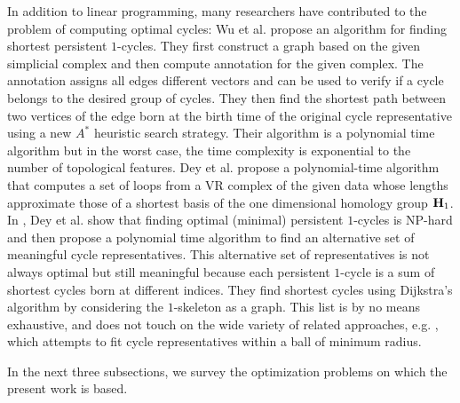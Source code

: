 In addition to linear programming, many researchers have contributed to the problem of computing optimal cycles: Wu et al. \cite{wu} propose an algorithm for finding shortest persistent $1$-cycles. They first construct a graph based on the given simplicial complex and then compute annotation for the given complex. The annotation assigns all edges different vectors and can be used to verify if a cycle belongs to the desired group of cycles. They then find the shortest path between two vertices of the edge born at the birth time of the original cycle representative using a new $A^*$ heuristic search strategy. Their algorithm is a polynomial time algorithm but in the worst case, the time complexity is exponential to the number of topological features. Dey et al. \cite{shortestonedimension} propose a polynomial-time algorithm that computes a set of loops from a VR complex of the given data whose lengths approximate those of a shortest basis of the one dimensional homology group $\mathbf{H}_1$. In \cite{dey2018}, Dey et al. show that finding optimal (minimal) persistent $1$-cycles is NP-hard and then propose a polynomial time algorithm to find an alternative set of meaningful cycle representatives. This alternative set of representatives is not always optimal but still meaningful because each persistent $1$-cycle is a sum of shortest cycles born at different indices. They find shortest cycles using Dijkstra's algorithm by considering the $1$-skeleton as a graph.   This list is by no means exhaustive, and does not touch on the wide variety of related approaches, e.g. \cite{chenhardness}, which attempts to fit cycle representatives within a ball of minimum radius.



 
 
\label{sec:minimalgenerators}

In the next \DIFaddbegin {}\DIFaddend three subsections, we \DIFdelbegin {}\DIFdelend survey the optimization problems on which the present work is based.
\\


\DIFaddbegin \subsection{}

\emph{} \emph{} \emph{}\DIFadd{) }\emph{} \emph{} \emph{}  


